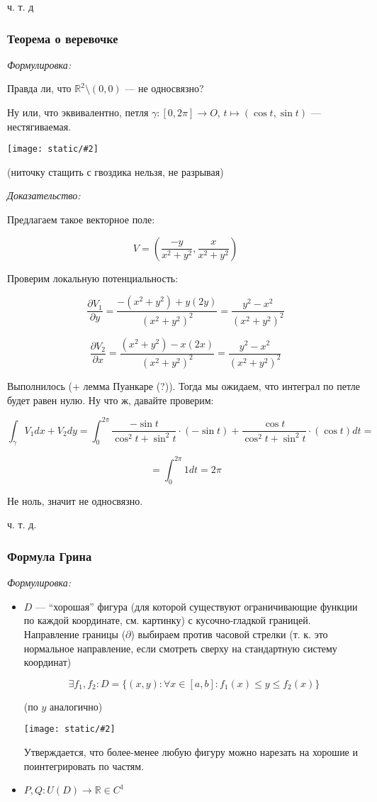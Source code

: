 \documentclass{article}
\def\images#1#2{\begin{center}\texttt{[image: static/\#2]}\end{center}}
\begin{document}
ч. т. д


\subsubsection{Теорема о веревочке}
\textit{Формулировка:}

Правда ли, что $\mathbb{R}^2 \setminus (0, 0)$ --- не односвязно? 

Ну или, что эквивалентно, петля $\gamma: [0, 2\pi] \rightarrow O$, $t \mapsto (\cos t, \sin t)$ --- нестягиваемая.

\images{0.5}{lemm_o_ver.jpg}

(ниточку стащить с гвоздика нельзя, не разрывая)

\textit{Доказательство:}

Предлагаем такое векторное поле:

\[V = \left( \frac{-y}{x^2 + y^2}, \frac{x}{x^2 + y^2}\right)\]

Проверим локальную потенциальность:

\[\frac{\partial V_1}{\partial y} = \frac{-(x^2 + y^2) + y(2y)}{(x^2 + y^2)^2} = \frac{y^2 - x^2}{(x^2 + y^2)^2}\]

\[\frac{\partial V_2}{\partial x} = \frac{(x^2 + y^2) - x(2x)}{(x^2 + y^2)^2} = \frac{y^2 - x^2}{(x^2 + y^2)^2}\]

Выполнилось (+ лемма Пуанкаре (?)). Тогда мы ожидаем, что интеграл по петле будет равен нулю. Ну что ж, давайте проверим:

\[\int_{\gamma} V_1 dx + V_2 dy = \int_{0}^{2\pi} \frac{-\sin t}{\cos^2 t + \sin^2 t} \cdot (- \sin t) + \frac{\cos t}{\cos^2 t + \sin^2 t} \cdot (\cos t) dt = \]

\[= \int_0^{2\pi} 1 dt = 2\pi\]

Не ноль, значит не односвязно. 

ч. т. д. 

\subsubsection{Формула Грина}
\textit{Формулировка:}

\begin{itemize}
    \item $D$ --- ``хорошая'' фигура (для которой существуют ограничивающие функции по каждой координате, см. картинку) с кусочно-гладкой границей. Направление границы ($\partial$) выбираем против часовой стрелки (т. к. это нормальное направление, если смотреть сверху на стандартную систему координат)
    
    \[\exists f_1, f_2: D = \{(x, y): \forall x \in [a, b]: f_1(x) \le y \le f_2(x)\}\]

    (по $y$ аналогично)

    \images{0.5}{green.jpg}

    Утверждается, что более-менее любую фигуру можно нарезать на хорошие и поинтегрировать по частям.

    \item $P, Q: U(D) \rightarrow \mathbb{R} \in C^1$
\end{itemize}
\end{document}
